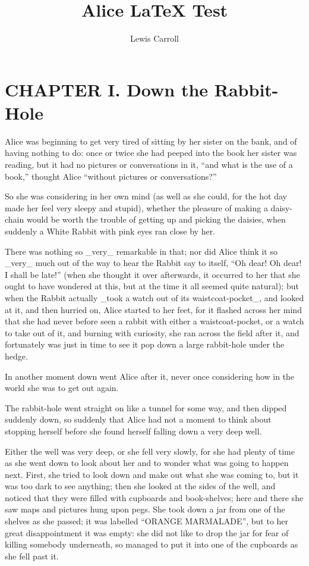 \documentclass{book}
\title{Alice LaTeX Test}
\author{Lewis Carroll}
\begin{document}
\maketitle
\chapter{CHAPTER I. Down the Rabbit-Hole}

Alice was beginning to get very tired of sitting by her sister on the bank, and of having nothing to do: once or twice she had peeped into the book her sister was reading, but it had no pictures or conversations in it, ``and what is the use of a book,'' thought Alice ``without pictures or conversations?''

So she was considering in her own mind (as well as she could, for the hot day made her feel very sleepy and stupid), whether the pleasure of making a daisy-chain would be worth the trouble of getting up and picking the daisies, when suddenly a White Rabbit with pink eyes ran close by her.

There was nothing so \_very\_ remarkable in that; nor did Alice think it so \_very\_ much out of the way to hear the Rabbit say to itself, ``Oh dear! Oh dear! I shall be late!'' (when she thought it over afterwards, it occurred to her that she ought to have wondered at this, but at the time it all seemed quite natural); but when the Rabbit actually \_took a watch out of its waistcoat-pocket\_, and looked at it, and then hurried on, Alice started to her feet, for it flashed across her mind that she had never before seen a rabbit with either a waistcoat-pocket, or a watch to take out of it, and burning with curiosity, she ran across the field after it, and fortunately was just in time to see it pop down a large rabbit-hole under the hedge.

In another moment down went Alice after it, never once considering how in the world she was to get out again.

The rabbit-hole went straight on like a tunnel for some way, and then dipped suddenly down, so suddenly that Alice had not a moment to think about stopping herself before she found herself falling down a very deep well.

Either the well was very deep, or she fell very slowly, for she had plenty of time as she went down to look about her and to wonder what was going to happen next. First, she tried to look down and make out what she was coming to, but it was too dark to see anything; then she looked at the sides of the well, and noticed that they were filled with cupboards and book-shelves; here and there she saw maps and pictures hung upon pegs. She took down a jar from one of the shelves as she passed; it was labelled ``ORANGE MARMALADE'', but to her great disappointment it was empty: she did not like to drop the jar for fear of killing somebody underneath, so managed to put it into one of the cupboards as she fell past it.
\end{document}
